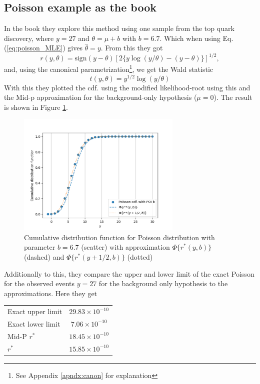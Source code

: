 \documentclass[14pt, a4paper]{article}  %
\begin{document}
\subsection{Poisson example as the book}\label{sec:book_example}
In the book they explore this method using one sample from the top quark discovery, where $y=27$ and $\theta=\mu+b$ with $b=6.7$. Which when using Eq. (\ref{eq:poisson_MLE}) gives $\hat{\theta}=y$. From this they got 
$$
r(y,\theta) = \text{sign}(y-\theta)[2\{y\log(y/\theta)-(y-\theta)\}]^{1/2},
$$
and, using the canonical parametrization\footnote{See Appendix \ref{apndx:canon} for explanation}, we get the Wald statistic
$$
t(y,\theta)=y^{1/2}\log(y/\theta)
$$
With this they plotted the cdf. using the modified likelihood-root using this and the Mid-p  approximation for the background-only hypothesis ($\mu=0$). The result is shown in Figure  \ref{fig:book_cdf}.
\begin{figure}[!ht]
	\centering
        \includegraphics[width=0.7\textwidth]{Book_examples/book_cdf.png}
	\caption{Cumulative distribution function for Poisson distribution with parameter $b=6.7$ (scatter) with approximation $\Phi\{r^*(y,b)\}$ (dashed) and $\Phi\{r^*(y+1/2,b)\}$ (dotted)}\label{fig:book_cdf}
\end{figure} 
Additionally to this, they compare the upper and lower limit of the exact Poisson for the observed events $y=27$ for the background only hypothesis to the approximations. Here they get
\begin{table}[!ht]
    \centering
    \begin{tabular}{l|c}
         Exact upper limit & $29.83\times10^{-10}$ \\
         Exact lower limit & $7.06\times10^{-10}$ \\
         Mid-P $r^*$& $18.45\times10^{-10}$ \\
         $r^*$ & $15.85\times10^{-10}$\\
    \end{tabular}
\end{table}
\end{document}
